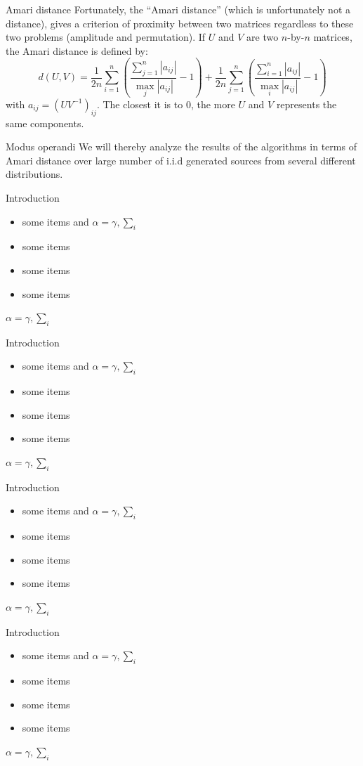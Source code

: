 \documentclass{beamer}
\begin{document}
\begin{frame}{}
\begin{columns}[T]
\begin{column}{.48\linewidth}
\begin{block}{Amari distance}
Fortunately, the ``Amari distance'' (which is unfortunately not a distance), gives a criterion of proximity between two matrices regardless to these two problems (amplitude and permutation).
If $U$ and $V$ are two $n$-by-$n$ matrices, the Amari distance is defined by:
\begin{equation*}
	d(U,V) = \frac{1}{2n}\sum\limits_{i=1}^n \left(\frac{\sum\limits_{j=1}^n|a_{ij}|}{\max_j |a_{ij}|}-1 \right)+\frac{1}{2n}\sum\limits_{j=1}^n \left(\frac{\sum\limits_{i=1}^n|a_{ij}|}{\max_i |a_{ij}|}-1 \right)
\end{equation*}
with $a_{ij} = (UV^{-1})_{ij}$. The closest it is to 0, the more $U$ and $V$ represents the same components.
\end{block}
\begin{block}{Modus operandi}
We will thereby analyze the results of the algorithms in terms of Amari distance over large number of i.i.d generated sources from several different distributions.
\end{block}
\begin{block}{Introduction}
\begin{itemize}
\item some items and $\alpha=\gamma, \sum_{i}$
\item some items
\item some items
\item some items
\end{itemize}
$\alpha=\gamma, \sum_{i}$
\end{block}
\begin{block}{Introduction}
\begin{itemize}
\item some items and $\alpha=\gamma, \sum_{i}$
\item some items
\item some items
\item some items
\end{itemize}
$\alpha=\gamma, \sum_{i}$
\end{block}
\begin{block}{Introduction}
\begin{itemize}
\item some items and $\alpha=\gamma, \sum_{i}$
\item some items
\item some items
\item some items
\end{itemize}
$\alpha=\gamma, \sum_{i}$
\end{block}
\begin{block}{Introduction}
\begin{itemize}
\item some items and $\alpha=\gamma, \sum_{i}$
\item some items
\item some items
\item some items
\end{itemize}
$\alpha=\gamma, \sum_{i}$
\end{block}


\end{column}
\end{columns}
\end{frame}
\end{document}

